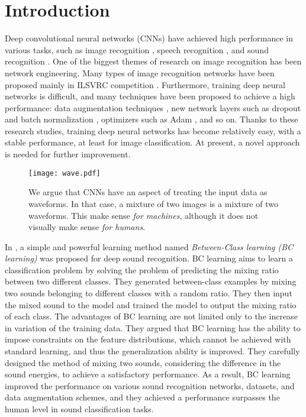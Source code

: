 \documentclass[10pt,twocolumn,letterpaper]{article}
\begin{document}
\section{Introduction}
Deep convolutional neural networks (CNNs) \cite{lecun1998gradient} have achieved high performance in various tasks, such as image recognition \cite{krizhevsky2012imagenet, he2016deep}, speech recognition \cite{abdel2014convolutional, sainath2015learning}, and sound recognition \cite{piczak2015environmental, tokozume2017learning}. One of the biggest themes of research on image recognition has been network engineering. Many types of image recognition networks have been proposed mainly in ILSVRC competition \cite{krizhevsky2012imagenet, simonyan2015very, szegedy2015going, he2016deep, xie2017aggregated, zhang2016polynet, hu2017squeeze}. Furthermore, training deep neural networks is difficult, and many techniques have been proposed to achieve a high performance: data augmentation techniques \cite{krizhevsky2012imagenet}, new network layers such as dropout \cite{srivastava2014dropout} and batch normalization \cite{ioffe2015batch}, optimizers such as Adam \cite{kingma2014adam}, and so on. Thanks to these research studies, training deep neural networks has become relatively easy, with a stable performance, at least for image classification. At present, a novel approach is needed for further improvement.

\begin{figure}
\begin{center}
	\texttt{[image: wave.pdf]}
\end{center}
\vspace{-3mm}
   \caption{We argue that CNNs have an aspect of treating the input data as waveforms. In that case, a mixture of two images is a mixture of two waveforms. This make sense {\it for machines}, although it does not visually make sense {\it for humans}.}
\label{fig:wave}
\vspace{-4mm}
\end{figure}

In \cite{tokozume2018learning}, a simple and powerful learning method named {\it Between-Class learning (BC learning)} was proposed for deep sound recognition. BC learning aims to learn a classification problem by solving the problem of predicting the mixing ratio between two different classes. They generated between-class examples by mixing two sounds belonging to different classes with a random ratio. They then input the mixed sound to the model and trained the model to output the mixing ratio of each class. The advantages of BC learning are not limited only to the increase in variation of the training data. They argued that BC learning has the ability to impose constraints on the feature distributions, which cannot be achieved with standard learning, and thus the generalization ability is improved. They carefully designed the method of mixing two sounds, considering the difference in the sound energies, to achieve a satisfactory performance. As a result, BC learning improved the performance on various sound recognition networks, datasets, and data augmentation schemes, and they achieved a performance surpasses the human level in sound classification tasks.
\end{document}
